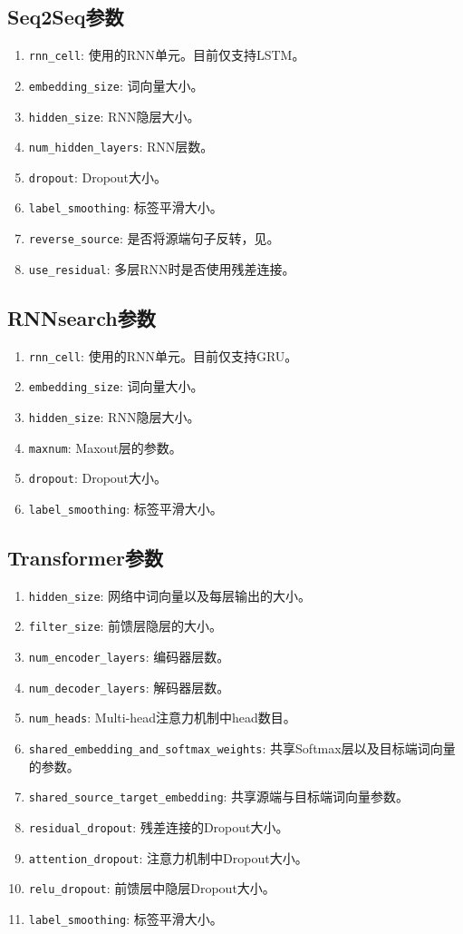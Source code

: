 \documentclass{article}
\begin{document}
\subsection{Seq2Seq参数}
\begin{enumerate}
\item \verb|rnn_cell|: 使用的RNN单元。目前仅支持LSTM。
\item \verb|embedding_size|: 词向量大小。
\item \verb|hidden_size|: RNN隐层大小。
\item \verb|num_hidden_layers|: RNN层数。
\item \verb|dropout|: Dropout大小。
\item \verb|label_smoothing|: 标签平滑大小。
\item \verb|reverse_source|: 是否将源端句子反转，见\citep{Sutskever:14}。
\item \verb|use_residual|: 多层RNN时是否使用残差连接。
\end{enumerate}
\subsection{RNNsearch参数}
\begin{enumerate}
\item \verb|rnn_cell|: 使用的RNN单元。目前仅支持GRU。
\item \verb|embedding_size|: 词向量大小。
\item \verb|hidden_size|: RNN隐层大小。
\item \verb|maxnum|: Maxout层的参数。
\item \verb|dropout|: Dropout大小。
\item \verb|label_smoothing|: 标签平滑大小。
\end{enumerate}
\subsection{Transformer参数}
\begin{enumerate}
\item \verb|hidden_size|: 网络中词向量以及每层输出的大小。
\item \verb|filter_size|: 前馈层隐层的大小。
\item \verb|num_encoder_layers|: 编码器层数。
\item \verb|num_decoder_layers|: 解码器层数。
\item \verb|num_heads|: Multi-head注意力机制中head数目。
\item \verb|shared_embedding_and_softmax_weights|: 共享Softmax层以及目标端词向量的参数。
\item \verb|shared_source_target_embedding|: 共享源端与目标端词向量参数。
\item \verb|residual_dropout|: 残差连接的Dropout大小。
\item \verb|attention_dropout|: 注意力机制中Dropout大小。
\item\verb|relu_dropout|: 前馈层中隐层Dropout大小。
\item \verb|label_smoothing|: 标签平滑大小。
\end{enumerate}
\end{document}
